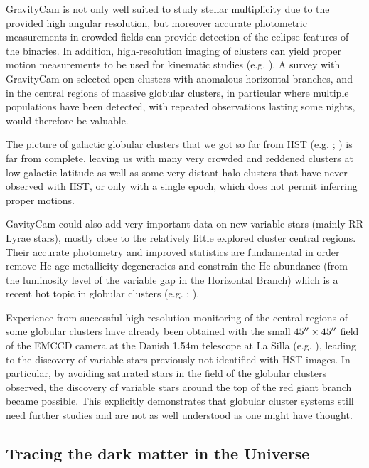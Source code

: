 \documentclass{pasa}%
\newcommand\arcsec{\hbox{$^{\prime\prime}$}}
\begin{document}
GravityCam is not only well suited to study stellar multiplicity due to the provided high angular resolution, but moreover accurate photometric measurements in crowded fields can provide detection of the eclipse features of the binaries. In addition, high-resolution imaging of clusters can yield proper motion measurements to be used for kinematic studies (e.g. \citealt{HSTPROMO}).
A survey with \mbox{GravityCam} on selected open clusters with anomalous horizontal branches, and in the central regions of massive globular clusters, in particular where multiple populations have been detected, with repeated observations lasting some nights, would therefore be valuable.

The picture of galactic globular clusters that we got so far from HST (e.g. \citealt{ACS}; \citealt{HSTPROMO}) is far from complete, leaving us with many very crowded and reddened clusters at low galactic latitude
as well as some very distant halo clusters that have never observed with HST, or only with a single
epoch, which does not permit inferring proper motions.

GavityCam could also add very important data
on new variable stars (mainly RR Lyrae stars), mostly close to the
relatively little explored cluster central regions. Their accurate
photometry
and improved statistics are fundamental in order remove
He-age-metallicity degeneracies and constrain the He abundance (from
the luminosity level of the variable gap in the Horizontal Branch) which is a recent
hot topic in globular clusters (e.g. \citealt{PopulationsBook}; \citealt{Kerber2018}).


Experience from successful high-resolution monitoring of the central regions of some globular clusters have already been obtained with the small $45\arcsec \times 45\arcsec$ field of the EMCCD camera at the Danish 1.54m telescope at La Silla (e.g. \citealt{Figuera+2016,Figuera2+2016}), leading to the discovery of variable stars previously not identified with HST images. In particular, by avoiding saturated stars in the field of the globular clusters observed, the discovery of variable stars around the top of the red giant branch became possible. This explicitly demonstrates that  globular cluster systems still need further studies and are not as well understood as one might have
thought.




\subsection{Tracing the dark matter in the Universe}
\end{document}
